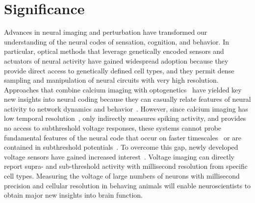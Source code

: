 \section{Significance}

Advances in neural imaging and perturbation have transformed our understanding of the neural
codes of sensation, cognition, and behavior. In particular, optical methods that leverage genetically encoded
sensors and actuators of neural activity have gained widespread adoption because they provide direct access
to genetically defined cell types, and they permit dense sampling and manipulation of neural circuits with very
high resolution. Approaches that combine  calcium imaging with  optogenetics~\cite{packer2014simultaneous,mardinly2018precise,yang2018simultaneous,rickgauer2014simultaneous,paluch2015all}
have yielded key new insights into neural coding because they can casually relate features of neural activity to network dynamics and behavior~\cite{marshel2019cortical,carrillo2019controlling,robinson2020targeted,daie2021targeted,carrillo2016imprinting,gill2020precise,forli2018two}. However, since calcium imaging has low temporal
resolution~\cite{chen2013ultrasensitive}, only indirectly measures spiking activity, and provides no access to subthreshold voltage
responses, these systems cannot probe fundamental features of the neural code that occur on faster timescales~\cite{gollisch2008rapid,butts2007temporal,berry1997structure,diesmann1999stable} or are contained in subthreshold potentials~\cite{sachidhanandam2013membrane,adesnik2017synaptic}. To overcome this  gap, newly developed voltage sensors have gained increased interest~\cite{}.
Voltage imaging
can directly report supra- and sub-threshold activity with millisecond resolution from specific cell types. 
Measuring the voltage of large numbers of
neurons with millisecond precision and cellular resolution in behaving animals  will enable neuroscientists to obtain major new insights into brain function.

